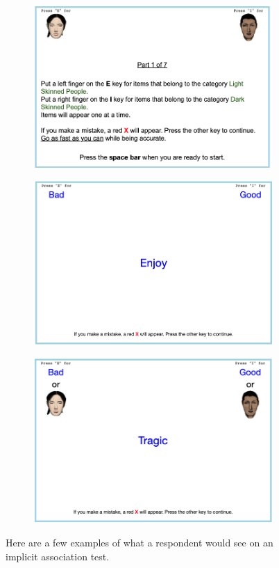 \begin{figure}[H]
\begin{subfigure}{.48\textwidth}
\end{subfigure}
\begin{subfigure}{.48\textwidth}
\centering
\includegraphics[width=.9\linewidth]{iatexample3.png}
\end{subfigure}
\begin{subfigure}{.48\textwidth}
\centering
\includegraphics[width=.9\linewidth]{iatexample4.png}
\end{subfigure}
\begin{subfigure}{.48\textwidth}
\centering
\includegraphics[width=.9\linewidth]{iatexample5.png}
\end{subfigure}
\caption*{\footnotesize{Here are a few examples of what a respondent would see on an implicit association test.}}
\end{figure}

